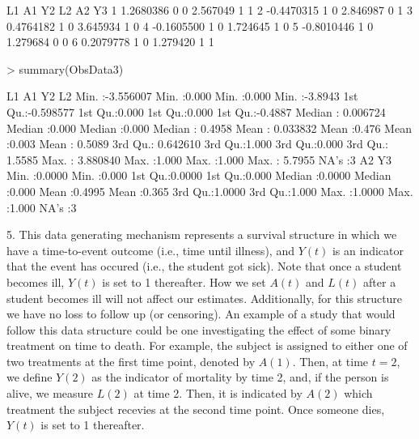 \documentclass{exam}
\newenvironment{myfigure}{\captionsetup{type=mytype}}{}
\begin{document}
\begin{solution}
\begin{Schunk}
\begin{Soutput}
          L1 A1 Y2       L2 A2 Y3
1  1.2680386  0  0 2.567049  1  1
2 -0.4470315  1  0 2.846987  0  1
3  0.4764182  1  0 3.645934  1  0
4 -0.1605500  1  0 1.724645  1  0
5 -0.8010446  1  0 1.279684  0  0
6  0.2079778  1  0 1.279420  1  1
\end{Soutput}
\begin{Sinput}
> summary(ObsData3)
\end{Sinput}
\begin{Soutput}
       L1                  A1              Y2              L2         
 Min.   :-3.556007   Min.   :0.000   Min.   :0.000   Min.   :-3.8943  
 1st Qu.:-0.598577   1st Qu.:0.000   1st Qu.:0.000   1st Qu.:-0.4887  
 Median : 0.006724   Median :0.000   Median :0.000   Median : 0.4958  
 Mean   : 0.033832   Mean   :0.476   Mean   :0.003   Mean   : 0.5089  
 3rd Qu.: 0.642610   3rd Qu.:1.000   3rd Qu.:0.000   3rd Qu.: 1.5585  
 Max.   : 3.880840   Max.   :1.000   Max.   :1.000   Max.   : 5.7955  
                                                     NA's   :3        
       A2               Y3       
 Min.   :0.0000   Min.   :0.000  
 1st Qu.:0.0000   1st Qu.:0.000  
 Median :0.0000   Median :0.000  
 Mean   :0.4995   Mean   :0.365  
 3rd Qu.:1.0000   3rd Qu.:1.000  
 Max.   :1.0000   Max.   :1.000  
 NA's   :3                       
\end{Soutput}
\end{Schunk}
5. This data generating mechanism represents a survival structure in which we have a time-to-event outcome (i.e., time until illness), and $Y(t)$ is an indicator that the event has occured (i.e., the student got sick). Note that once a student becomes ill, $Y(t)$ is set to 1 thereafter. How we set $A(t)$ and $L(t)$ after a student becomes ill will not affect our estimates. Additionally, for this structure we have no loss to follow up (or censoring). An example of a study that would follow this data structure could be one investigating the effect of some binary treatment on time to death. For example, the subject is assigned to either one of two treatments at the first time point, denoted by $A(1)$. Then, at time $t = 2$, we define $Y(2)$ as the indicator of mortality by time 2, and, if the person is alive, we measure $L(2)$ at time 2. Then, it is indicated by $A(2)$ which treatment the subject recevies at the second time point. Once someone dies, $Y(t)$ is set to 1 thereafter. 


\end{solution}
\end{document}
